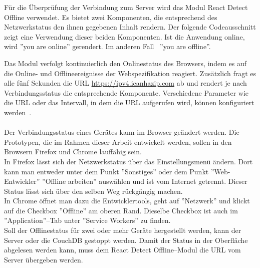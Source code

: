 Für die Überprüfung der Verbindung zum Server wird das Modul React Detect Offline verwendet.
Es bietet zwei Komponenten, die entsprechend des Netzwerkstatus den ihnen gegebenen Inhalt rendern.
Der folgende Codeausschnitt zeigt eine Verwendung dieser beiden Komponenten. Ist die Anwendung online, wird ''you are online'' gerendert. Im anderen Fall ~''you are offline''.
%
\begin{center}

\end{center}
%
Das Modul verfolgt kontinuierlich den Onlinestatus des Browsers, indem es auf die Online- und Offlineereignisse der Webspezifikation reagiert. Zusätzlich fragt es alle fünf Sekunden die URL \url{https://ipv4.icanhazip.com} ab und rendert je nach Verbindungsstatus die entsprechende Komponente.
Verschiedene Parameter wie die URL oder das Intervall, in dem die URL aufgerufen wird, können konfiguriert werden~\cite{react-detect}. \\\\
%
Der Verbindungsstatus eines Gerätes kann im Browser geändert werden.
Die Prototypen, die im Rahmen dieser Arbeit entwickelt werden, sollen in den Browsern Firefox und Chrome lauffähig sein.\\
In Firefox lässt sich der Netzwerkstatus über das Einstellungsmenü ändern. Dort kann man entweder unter dem Punkt ''Sonstiges'' oder dem Punkt ''Web-Entwickler'' ''Offline arbeiten'' auswählen und ist vom Internet getrennt. Dieser Status lässt sich über den selben Weg rückgängig machen.\\
In Chrome öffnet man dazu die Entwicklertools, geht auf ''Netzwerk'' und klickt auf die Checkbox ''Offline'' am oberen Rand. Dieselbe Checkbox ist auch im ''Application''--Tab unter ''Service Workers'' zu finden.\\
Soll der Offlinestatus für zwei oder mehr Geräte hergestellt werden, kann der Server oder die CouchDB gestoppt werden. Damit der Status in der Oberfläche abgelesen werden kann, muss dem React Detect Offline--Modul die URL vom Server übergeben werden.